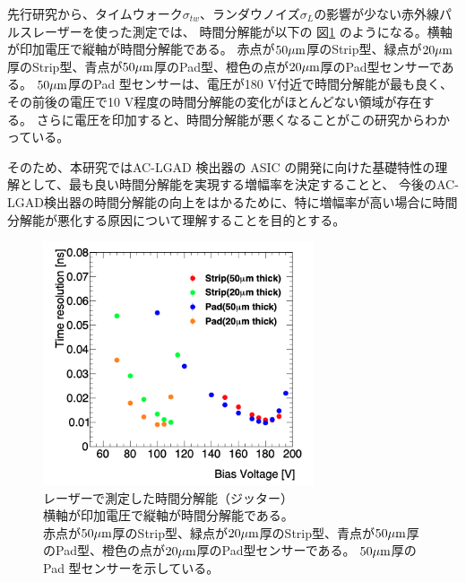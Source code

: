 先行研究\cite{Kita_Master}から、タイムウォーク$\sigma_{tw}$、ランダウノイズ$\sigma_{L}$の影響が少ない赤外線パルスレーザーを使った測定では、
時間分解能が以下の 図\ref{fg:Kita_JittervsVoltage} のようになる。横軸が印加電圧で縦軸が時間分解能である。
赤点が$50 \rm{\mu m}$厚のStrip型、緑点が$20 \rm{\mu m}$厚のStrip型、青点が$50 \rm{\mu m}$厚のPad型、橙色の点が$20 \rm{\mu m}$厚のPad型センサーである。
$50 \rm{\mu m}$厚のPad 型センサーは、電圧が180 V付近で時間分解能が最も良く、その前後の電圧で10 V程度の時間分解能の変化がほとんどない領域が存在する。
さらに電圧を印加すると、時間分解能が悪くなることがこの研究からわかっている。

そのため、本研究ではAC-LGAD 検出器の ASIC の開発に向けた基礎特性の理解として、最も良い時間分解能を実現する増幅率を決定することと、
今後のAC-LGAD検出器の時間分解能の向上をはかるために、特に増幅率が高い場合に時間分解能が悪化する原因について理解することを目的とする。



\begin{figure}[H]
    \centering
    \includegraphics[width=8cm]{fig/ch1/Kita_JittervsVoltage.png}
    \caption[レーザーで測定した時間分解能（ジッター）\cite{Kita_Master}]{レーザーで測定した時間分解能（ジッター）\cite{Kita_Master}\\横軸が印加電圧で縦軸が時間分解能である。\\赤点が$50 \rm{\mu m}$厚のStrip型、緑点が$20 \rm{\mu m}$厚のStrip型、青点が$50 \rm{\mu m}$厚のPad型、橙色の点が$20 \rm{\mu m}$厚のPad型センサーである。
    $50 \rm{\mu m}$厚のPad 型センサーを示している。}
    \label{fg:Kita_JittervsVoltage}
\end{figure}





